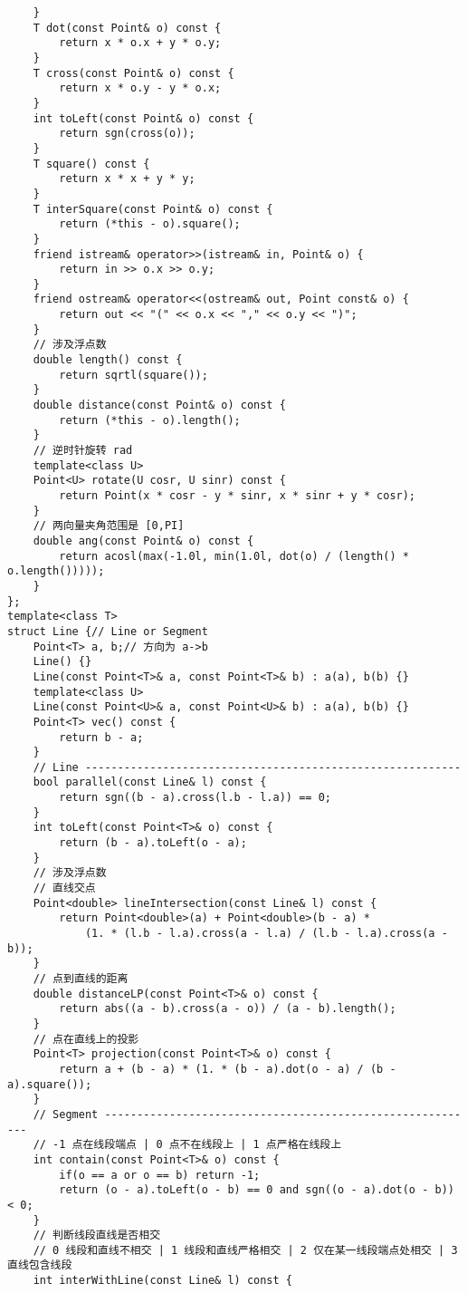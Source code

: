 \begin{lstlisting}
    }
    T dot(const Point& o) const {
        return x * o.x + y * o.y;
    }
    T cross(const Point& o) const {
        return x * o.y - y * o.x;
    }
    int toLeft(const Point& o) const {
        return sgn(cross(o));
    }
    T square() const {
        return x * x + y * y;
    }
    T interSquare(const Point& o) const {
        return (*this - o).square();
    }
    friend istream& operator>>(istream& in, Point& o) {
        return in >> o.x >> o.y;
    }
    friend ostream& operator<<(ostream& out, Point const& o) {
        return out << "(" << o.x << "," << o.y << ")";
    }
    // 涉及浮点数
    double length() const {
        return sqrtl(square());
    }
    double distance(const Point& o) const {
        return (*this - o).length();
    }
    // 逆时针旋转 rad
    template<class U>
    Point<U> rotate(U cosr, U sinr) const {
        return Point(x * cosr - y * sinr, x * sinr + y * cosr);
    }
    // 两向量夹角范围是 [0,PI]
    double ang(const Point& o) const {
        return acosl(max(-1.0l, min(1.0l, dot(o) / (length() * o.length()))));
    }
};
template<class T>
struct Line {// Line or Segment
    Point<T> a, b;// 方向为 a->b
    Line() {}
    Line(const Point<T>& a, const Point<T>& b) : a(a), b(b) {}
    template<class U>
    Line(const Point<U>& a, const Point<U>& b) : a(a), b(b) {}
    Point<T> vec() const {
        return b - a;
    }
    // Line ----------------------------------------------------------
    bool parallel(const Line& l) const {
        return sgn((b - a).cross(l.b - l.a)) == 0;
    }
    int toLeft(const Point<T>& o) const {
        return (b - a).toLeft(o - a);
    }
    // 涉及浮点数
    // 直线交点
    Point<double> lineIntersection(const Line& l) const {
        return Point<double>(a) + Point<double>(b - a) *
            (1. * (l.b - l.a).cross(a - l.a) / (l.b - l.a).cross(a - b));
    }
    // 点到直线的距离
    double distanceLP(const Point<T>& o) const {
        return abs((a - b).cross(a - o)) / (a - b).length();
    }
    // 点在直线上的投影
    Point<T> projection(const Point<T>& o) const {
        return a + (b - a) * (1. * (b - a).dot(o - a) / (b - a).square());
    }
    // Segment ----------------------------------------------------------
    // -1 点在线段端点 | 0 点不在线段上 | 1 点严格在线段上
    int contain(const Point<T>& o) const {
        if(o == a or o == b) return -1;
        return (o - a).toLeft(o - b) == 0 and sgn((o - a).dot(o - b)) < 0;
    }
    // 判断线段直线是否相交
    // 0 线段和直线不相交 | 1 线段和直线严格相交 | 2 仅在某一线段端点处相交 | 3 直线包含线段
    int interWithLine(const Line& l) const {

\end{lstlisting}
